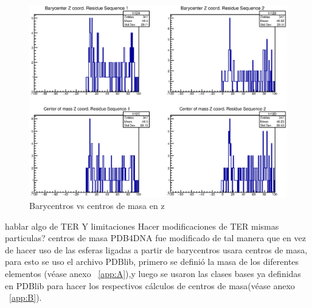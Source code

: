 \begin{figure}[htbp]
    \centering
    \includegraphics[width=1\linewidth]{./Figures/can3.eps}
  \caption[Barycentros vs centros de masa en z]{Barycentros vs centros de masa en z}
    \label{fig:canz}
\end{figure}


hablar algo de TER Y limitaciones
Hacer modificaciones de TER
mismas particulas?
centros de masa
PDB4DNA fue modificado de tal manera que en vez de hacer uso de las esferas ligadas a partir de barycentros usara centros de masa, para esto se uso el archivo PDBlib, primero se definió la masa de los diferentes elementos (véase anexo ~\ref{app:A}),y luego se usaron las clases bases ya definidas en PDBlib para hacer los respectivos cálculos de centros de masa(véase anexo ~\ref{app:B}).\\
